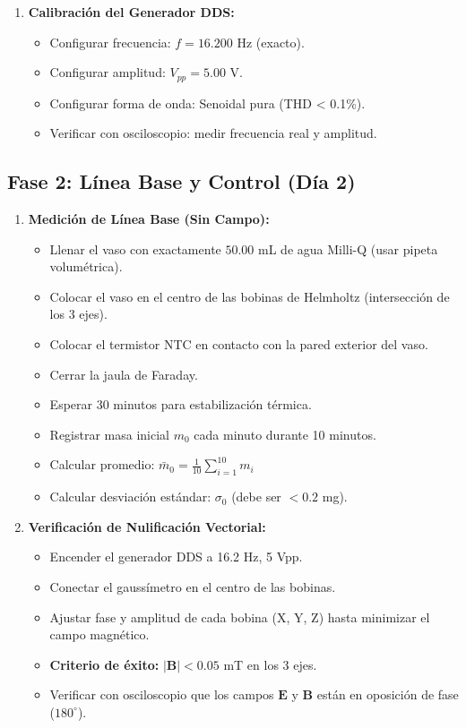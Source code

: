 \documentclass[12pt, a4paper]{article}
\begin{document}
\begin{enumerate}[label=\textbf{Paso \arabic*:}, leftmargin=*]
    \item \textbf{Calibración del Generador DDS:}
    \begin{itemize}
        \item Configurar frecuencia: $f = 16.200$ Hz (exacto).
        \item Configurar amplitud: $V_{pp} = 5.00$ V.
        \item Configurar forma de onda: Senoidal pura (THD < 0.1\%).
        \item Verificar con osciloscopio: medir frecuencia real y amplitud.
    \end{itemize}
\end{enumerate}

\subsection{Fase 2: Línea Base y Control (Día 2)}

\begin{enumerate}[label=\textbf{Paso \arabic*:}, leftmargin=*, start=5]
    \item \textbf{Medición de Línea Base (Sin Campo):}
    \begin{itemize}
        \item Llenar el vaso con exactamente $50.00$ mL de agua Milli-Q (usar pipeta volumétrica).
        \item Colocar el vaso en el centro de las bobinas de Helmholtz (intersección de los 3 ejes).
        \item Colocar el termistor NTC en contacto con la pared exterior del vaso.
        \item Cerrar la jaula de Faraday.
        \item Esperar 30 minutos para estabilización térmica.
        \item Registrar masa inicial $m_0$ cada minuto durante 10 minutos.
        \item Calcular promedio: $\bar{m}_0 = \frac{1}{10} \sum_{i=1}^{10} m_i$
        \item Calcular desviación estándar: $\sigma_0$ (debe ser $< 0.2$ mg).
    \end{itemize}
    
    \item \textbf{Verificación de Nulificación Vectorial:}
    \begin{itemize}
        \item Encender el generador DDS a 16.2 Hz, 5 Vpp.
        \item Conectar el gaussímetro en el centro de las bobinas.
        \item Ajustar fase y amplitud de cada bobina (X, Y, Z) hasta minimizar el campo magnético.
        \item \textbf{Criterio de éxito:} $|\mathbf{B}| < 0.05$ mT en los 3 ejes.
        \item Verificar con osciloscopio que los campos $\mathbf{E}$ y $\mathbf{B}$ están en oposición de fase ($180^\circ$).
    \end{itemize}
\end{enumerate}
\end{document}
